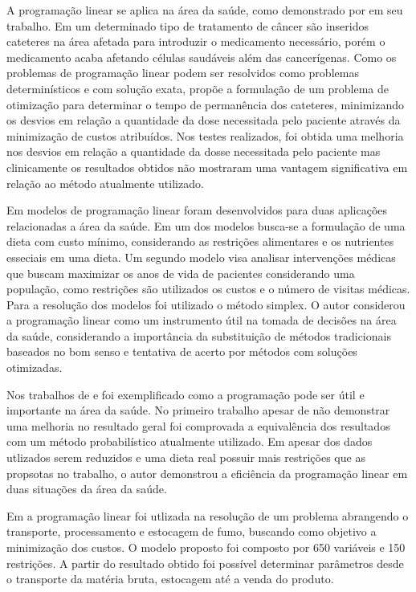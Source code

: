 A programação linear se aplica na área da saúde, como demonstrado por  em seu trabalho. Em um determinado tipo de tratamento de câncer são inseridos cateteres na área afetada para introduzir o medicamento necessário, porém o medicamento acaba afetando células saudáveis além das cancerígenas. Como os problemas de programação linear podem ser resolvidos como problemas determinísticos e com solução exata,  propõe a formulação de um problema de otimização para determinar o tempo de permanência dos cateteres, minimizando os desvios em relação a quantidade da dose necessitada pelo paciente através da minimização de custos atribuídos. Nos testes realizados, foi obtida uma melhoria nos desvios em relação a quantidade da dosse necessitada pelo paciente mas clinicamente os resultados obtidos não mostraram uma vantagem significativa em relação ao método atualmente utilizado.

Em  modelos de programação linear foram desenvolvidos para duas aplicações relacionadas a área da saúde. Em um dos modelos busca-se a formulação de uma dieta com custo mínimo, considerando as restrições alimentares e os nutrientes esseciais em uma dieta. Um segundo modelo visa analisar intervenções médicas que buscam maximizar os anos de vida de pacientes considerando uma população, como restrições são utilizados os custos e o número de visitas médicas. Para a resolução dos modelos foi utilizado o método simplex. O autor considerou a programação linear como um instrumento útil na tomada de decisões na área da saúde, considerando a importância da substituição de métodos tradicionais baseados no bom senso e tentativa de acerto por métodos com soluções otimizadas.

Nos trabalhos de  e  foi exemplificado como a programação pode ser útil e importante na área da saúde. No primeiro trabalho apesar de não demonstrar uma melhoria no resultado geral foi comprovada a equivalência dos resultados com um método probabilístico atualmente utilizado. Em  apesar dos dados utlizados serem reduzidos e uma dieta real possuir mais restrições que as propsotas no trabalho, o autor demonstrou a eficiência da programação linear em duas situações da área da saúde.

Em  a programação linear foi utlizada na resolução de um problema abrangendo o transporte, processamento e estocagem de fumo, buscando como objetivo a minimização dos custos. O modelo proposto foi composto por 650 variáveis e 150 restrições. A partir do resultado obtido foi possível determinar parâmetros desde o transporte da matéria bruta, estocagem até a venda do produto.

